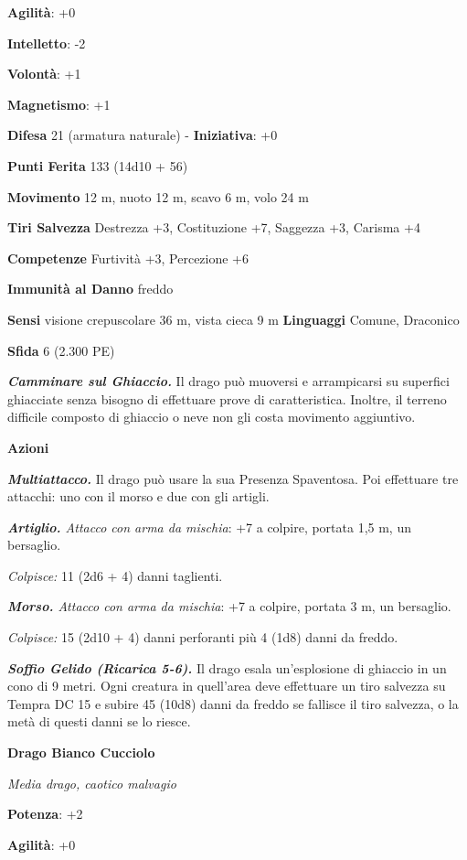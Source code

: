 \begin{multicols}{2}
\textbf{Agilità}: +0

\textbf{Intelletto}: -2

\textbf{Volontà}: +1

\textbf{Magnetismo}: +1

\textbf{Difesa} 21 (armatura naturale) - \textbf{Iniziativa}: +0

\textbf{Punti Ferita} 133 (14d10 + 56)

\textbf{Movimento} 12 m, nuoto 12 m, scavo 6 m, volo 24 m

\textbf{Tiri Salvezza} Destrezza +3, Costituzione +7, Saggezza +3,
Carisma +4

\textbf{Competenze} Furtività +3, Percezione +6

\textbf{Immunità al Danno} freddo

\textbf{Sensi} visione crepuscolare 36 m, vista cieca 9 m
\textbf{Linguaggi} Comune, Draconico

\textbf{Sfida} 6 (2.300 PE)

\emph{\textbf{Camminare sul Ghiaccio.}} Il drago può muoversi e
arrampicarsi su superfici ghiacciate senza bisogno di effettuare prove
di caratteristica. Inoltre, il terreno difficile composto di ghiaccio o
neve non gli costa movimento aggiuntivo.

\textbf{Azioni}

\emph{\textbf{Multiattacco.}} Il drago può usare la sua Presenza
Spaventosa. Poi effettuare tre attacchi: uno con il morso e due con gli
artigli.

\emph{\textbf{Artiglio.} Attacco con arma da mischia}: +7 a colpire,
portata 1,5 m, un bersaglio.

\emph{Colpisce:} 11 (2d6 + 4) danni taglienti.

\emph{\textbf{Morso.} Attacco con arma da mischia}: +7 a colpire,
portata 3 m, un bersaglio.

\emph{Colpisce:} 15 (2d10 + 4) danni perforanti più 4 (1d8) danni da
freddo.

\emph{\textbf{Soffio Gelido (Ricarica 5-6).}} Il drago esala
un'esplosione di ghiaccio in un cono di 9 metri. Ogni creatura in
quell'area deve effettuare un tiro salvezza su Tempra DC 15 e
subire 45 (10d8) danni da freddo se fallisce il tiro salvezza, o la metà
di questi danni se lo riesce.

\textbf{Drago Bianco Cucciolo}

\emph{Media drago, caotico malvagio}

\textbf{Potenza}: +2

\textbf{Agilità}: +0


\end{multicols}
